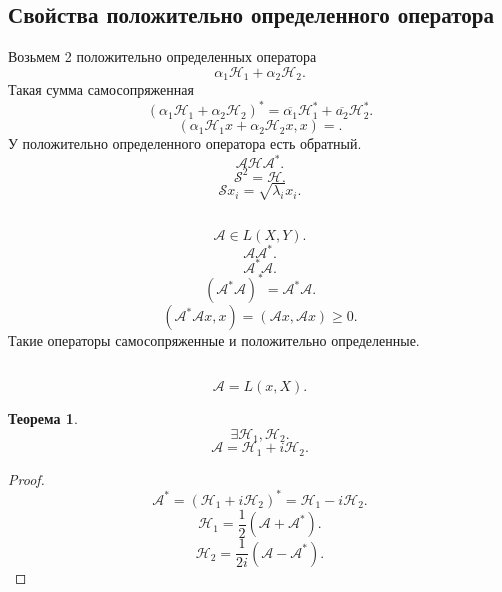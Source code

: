 \documentclass{scrartcl}
\newtheorem{theorem}{Теорема}
\begin{document}
\subsection{Свойства положительно определенного оператора}
Возьмем 2 положительно определенных оператора
\[
    \alpha_1 \mathcal{H}_{1} + \alpha_2  \mathcal{H}_{2}
.\] 
Такая сумма самосопряженная
\[
    (\alpha_1 \mathcal{H}_{1} + \alpha_2  \mathcal{H}_{2})^{*} =
    \overline{\alpha_1} \mathcal{H}^{*}_{1} + \overline{a_2} \mathcal{H}^{*}_{2}
.\] 
\[
    (\alpha_1 \mathcal{H}_{1}x + \alpha_2 \mathcal{H}_{2} x, x) =
.\] 
У положительно определенного оператора есть обратный.
\[
    \mathcal{A} \mathcal{H} \mathcal{A}^{*}
.\] 
\[
    \mathcal{S} ^2 = \mathcal{H}
.\] 
\[
    \mathcal{S} x_{i} = \sqrt{\lambda_{i}}  x_{i}
.\] 
\subsection{}
\[
    \mathcal{A} \in L(X,Y)
.\] 
\[
    \mathcal{A} \mathcal{A}^{*}
.\] 
\[
    \mathcal{A}^{*} \mathcal{A}
.\] 
\[
    (\mathcal{A}^{*} \mathcal{A})^{*} = \mathcal{A}^{*} \mathcal{A}
.\] 
\[
    (\mathcal{A}^{*} \mathcal{A} x, x ) = (\mathcal{A}x,\mathcal{A} x) \ge  0
.\] 
Такие операторы самосопряженные и положительно определенные.
\subsection{}
\[
    \mathcal{A} = L(x,X)
.\] 
\begin{theorem}
    \[
        \exists  \mathcal{H}_{1}, \mathcal{H}_{2}
    .\] 
    \[
        \mathcal{A} =\mathcal{H}_{1} + i \mathcal{H}_{2}
    .\] 
\end{theorem}
\begin{proof}
    \[
        \mathcal{A}^{*} = (\mathcal{H}_{1} + i\mathcal{H}_{2})^{*} = \mathcal{H}_{1}-i\mathcal{H}_{2}
    .\]  
    \[
        \mathcal{H}_{1} = \frac{1}{2} (\mathcal{A} + \mathcal{A}^{*})
    .\] 
    \[
        \mathcal{H}_{2} = \frac{1}{2i} (\mathcal{A} - \mathcal{A}^{*})
    .\] 
\end{proof}
\end{document}
